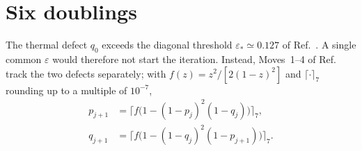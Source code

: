 \documentclass[aps,prl,reprint,amsmath,amssymb,nofootinbib,raggedbottom]{revtex4-2}
\begin{document}
\section{Six doublings}\label{app:c-doubling}
The thermal defect $q_0$ exceeds the diagonal threshold
$\varepsilon_*\simeq0.127$ of Ref.~\cite{scope}. A single common $\varepsilon$
would therefore not start the iteration. Instead, Moves~1--4 of Ref.~\cite{main}
track the two defects separately; with $f(z)=z^2/[2(1-z)^2]$ and
$\lceil\cdot\rceil_7$ rounding up to a multiple of $10^{-7}$,
\begin{equation}
 \begin{aligned}
 p_{j+1}&=\bigl\lceil f\bigl(1-(1-p_j)^2(1-q_j)\bigr)\bigr\rceil_7,\\
 q_{j+1}&=\bigl\lceil f\bigl(1-(1-q_j)^2(1-p_{j+1})\bigr)\bigr\rceil_7.
 \end{aligned}
 \label{eq:c-update}
\end{equation}
\end{document}
